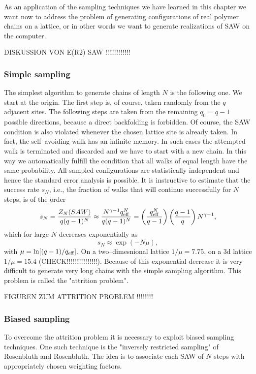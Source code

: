 As an application of the sampling techniques we have learned in 
this chapter we want now to address the problem of generating 
configurations of real polymer chains on a lattice, or in other 
words we want to generate realizations of SAW on the computer.

DISKUSSION VON E(R2) SAW !!!!!!!!!!!!!

\subsubsection{Simple sampling}
The simplest algorithm to generate chains of  length $N$ is the 
following one. We start at the origin. The first step is, of 
course,  taken randomly from the $q$ adjacent sites. The following 
steps are taken from the remaining $q_0=q-1$ possible directions, 
because a direct backfolding is forbidden. Of course, the SAW 
condition is also violated whenever the chosen lattice site is 
already taken. In fact, the self--avoiding walk has an infinite
memory. In such cases the attempted walk is terminated and 
discarded and we have to start with a new chain. In this way we 
automatically fulfill the condition that all walks  of equal 
length have the same probability. All sampled configurations are 
statistically independent and hence the standard error analysis 
is possible. It is instructive to estimate that the success rate
$s_N$, i.e., the fraction of walks that will continue successfully 
for $N$ steps, is of the order
\begin{equation*}
s_N = \frac{Z_N(SAW)}{q(q-1)^N} \approx
      \frac{N^{\gamma -1} q_{\rm eff}^N}{q(q-1)^N}
       = \left( \frac{q_{\rm eff}^N}{q-1}\right) 
         \left( \frac{q-1}{q} \right) N^{\gamma -1},
\end{equation*}
which for large $N$ decreases exponentially as
\begin{equation*}
s_N \approx \exp(-N \mu),
\end{equation*}
with $\mu=\ln[(q-1)/q_{\rm eff}]$. 
On a two--dimesnional lattice $1/\mu = 7.75$, on a 3d lattice
$1/\mu = 15.4$ (CHECK!!!!!!!!!!!!!!!!). Because of this exponential 
decrease it is very  difficult to generate very long chains with 
the simple sampling algorithm. This problem is called the 
"attrition problem".

FIGUREN ZUM ATTRITION PROBLEM !!!!!!!!!

\subsubsection{Biased sampling}
To overcome the attrition problem it is necessary to exploit 
biased sampling techniques. One such technique is the "inversely
restricted sampling" of Rosenbluth and Rosenbluth. The idea is to
associate each SAW of $N$ steps with appropriately chosen weighting 
factors. 


